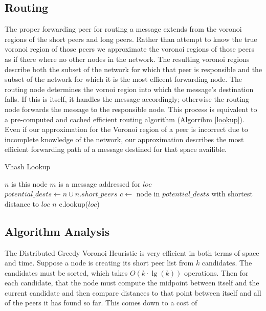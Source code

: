 \documentclass{IEEEtran}
\begin{document}
\subsection{Routing}
The proper forwarding peer for routing a message extends from the voronoi regions of the short peers and long peers.
Rather than attempt to know the true voronoi region of those peers we approximate the voronoi regions of those peers as if there where no other nodes in the network.
The resulting voronoi regions describe both the subset of the network for which that peer is responsible and the subset of the network for which it is the most efficent forwarding node.
The routing node determines the vornoi region into which the message's destination falls.
If this is itself, it handles the message accordingly; otherwise the routing node forwards the message to the responsible node.
This process is equivalent to a pre-computed and cached efficient routing algorithm (Algorrihm \ref{lookup}).
Even if our approximation for the Voronoi region of a peer is incorrect due to incomplete knowledge of the network, our approximation describes the most efficient forwarding path of a message  destined for that space availible.

\begin{algorithm}
\caption{Vhash Lookup}
\label{lookup}
\begin{algorithmic}[1] 
	\STATE $n$ is this node
	\STATE $m$ is a message addressed for $loc$
    \STATE $potential\_dests \leftarrow n \cup n.short\_peers$
    \STATE $c \leftarrow $ node in $ potential\_dests$ with shortest distance to $loc$
    	\RETURN $n$
    \ELSE
        \RETURN c.lookup($loc$)
    \ENDIF
\end{algorithmic}
\end{algorithm}



\subsection{Algorithm Analysis}
The Distributed Greedy Voronoi Heuristic is very efficient in both terms of space and time.  Suppose a node is creating its short peer list from $k$ candidates.  The candidates must be sorted, which takes $O(k\cdot\lg(k))$ operations.  Then for each candidate, that the node must compute the midpoint between itself and the current candidate and then compare distances to that point between itself and all of the peers it has found so far.  This comes down to a cost of 
\end{document}

